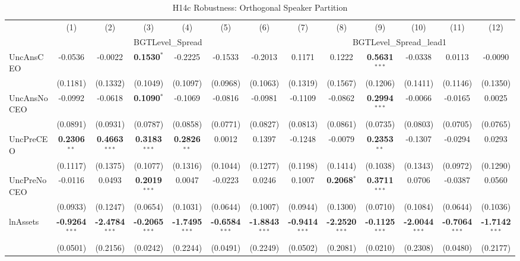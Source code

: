 \documentclass[11pt,a4paper]{article}
\begin{document}
\begin{table}[htbp]
\centering
\caption{H14c Robustness: Orthogonal Speaker Partition}
\label{tab:h14c_robust}
\scriptsize
\begin{tabular}{lcccccccccccc}
\toprule
 & (1) & (2) & (3) & (4) & (5) & (6) & (7) & (8) & (9) & (10) & (11) & (12) \\
 & \multicolumn{6}{c}{BGTLevel\_Spread} & \multicolumn{6}{c}{BGTLevel\_Spread\_lead1} \\
\cmidrule(lr){2-7} \cmidrule(lr){8-13}
\midrule
UncAnsCEO & -0.0536 & -0.0022 & \textbf{0.1530}$^{*}$ & -0.2225 & -0.1533 & -0.2013 & 0.1171 & 0.1222 & \textbf{0.5631}$^{***}$ & -0.0338 & 0.0113 & -0.0090 \\
 & (0.1181) & (0.1332) & (0.1049) & (0.1097) & (0.0968) & (0.1063) & (0.1319) & (0.1567) & (0.1206) & (0.1411) & (0.1146) & (0.1350) \\
UncAnsNoCEO & -0.0992 & -0.0618 & \textbf{0.1090}$^{*}$ & -0.1069 & -0.0816 & -0.0981 & -0.1109 & -0.0862 & \textbf{0.2994}$^{***}$ & -0.0066 & -0.0165 & 0.0025 \\
 & (0.0891) & (0.0931) & (0.0787) & (0.0858) & (0.0771) & (0.0827) & (0.0813) & (0.0861) & (0.0735) & (0.0803) & (0.0705) & (0.0765) \\
UncPreCEO & \textbf{0.2306}$^{**}$ & \textbf{0.4663}$^{***}$ & \textbf{0.3183}$^{***}$ & \textbf{0.2826}$^{**}$ & 0.0012 & 0.1397 & -0.1248 & -0.0079 & \textbf{0.2353}$^{**}$ & -0.1307 & -0.0294 & 0.0293 \\
 & (0.1117) & (0.1375) & (0.1077) & (0.1316) & (0.1044) & (0.1277) & (0.1198) & (0.1414) & (0.1038) & (0.1343) & (0.0972) & (0.1290) \\
UncPreNoCEO & -0.0116 & 0.0493 & \textbf{0.2019}$^{***}$ & 0.0047 & -0.0223 & 0.0246 & 0.1007 & \textbf{0.2068}$^{*}$ & \textbf{0.3711}$^{***}$ & 0.0706 & -0.0387 & 0.0560 \\
 & (0.0933) & (0.1247) & (0.0654) & (0.1031) & (0.0644) & (0.1007) & (0.0944) & (0.1300) & (0.0710) & (0.1084) & (0.0644) & (0.1036) \\
\midrule
lnAssets & \textbf{-0.9264}$^{***}$ & \textbf{-2.4784}$^{***}$ & \textbf{-0.2065}$^{***}$ & \textbf{-1.7495}$^{***}$ & \textbf{-0.6584}$^{***}$ & \textbf{-1.8843}$^{***}$ & \textbf{-0.9414}$^{***}$ & \textbf{-2.2520}$^{***}$ & \textbf{-0.1125}$^{***}$ & \textbf{-2.0044}$^{***}$ & \textbf{-0.7064}$^{***}$ & \textbf{-1.7142}$^{***}$ \\
 & (0.0501) & (0.2156) & (0.0242) & (0.2244) & (0.0491) & (0.2249) & (0.0502) & (0.2081) & (0.0210) & (0.2308) & (0.0480) & (0.2177) \\

\end{tabular}
\end{table}
\end{document}

